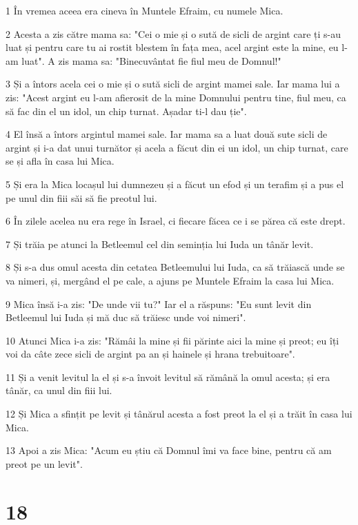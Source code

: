 \par 1 În vremea aceea era cineva în Muntele Efraim, cu numele Mica.
\par 2 Acesta a zis către mama sa: "Cei o mie și o sută de sicli de argint care ți s-au luat și pentru care tu ai rostit blestem în fața mea, acel argint este la mine, eu l-am luat". A zis mama sa: "Binecuvântat fie fiul meu de Domnul!"
\par 3 Și a întors acela cei o mie și o sută sicli de argint mamei sale. Iar mama lui a zis: "Acest argint eu l-am afierosit de la mine Domnului pentru tine, fiul meu, ca să fac din el un idol, un chip turnat. Așadar ti-l dau ție".
\par 4 El însă a întors argintul mamei sale. Iar mama sa a luat două sute sicli de argint și i-a dat unui turnător și acela a făcut din ei un idol, un chip turnat, care se și afla în casa lui Mica.
\par 5 Și era la Mica locașul lui dumnezeu și a făcut un efod și un terafim și a pus el pe unul din fiii săi să fie preotul lui.
\par 6 În zilele acelea nu era rege în Israel, ci fiecare făcea ce i se părea că este drept.
\par 7 Și trăia pe atunci la Betleemul cel din seminția lui Iuda un tânăr levit.
\par 8 Și s-a dus omul acesta din cetatea Betleemului lui Iuda, ca să trăiască unde se va nimeri, și, mergând el pe cale, a ajuns pe Muntele Efraim la casa lui Mica.
\par 9 Mica însă i-a zis: "De unde vii tu?" Iar el a răspuns: "Eu sunt levit din Betleemul lui Iuda și mă duc să trăiesc unde voi nimeri".
\par 10 Atunci Mica i-a zis: "Rămâi la mine și fii părinte aici la mine și preot; eu îți voi da câte zece sicli de argint pa an și hainele și hrana trebuitoare".
\par 11 Și a venit levitul la el și s-a învoit levitul să rămână la omul acesta; și era tânăr, ca unul din fiii lui.
\par 12 Și Mica a sfințit pe levit și tânărul acesta a fost preot la el și a trăit în casa lui Mica.
\par 13 Apoi a zis Mica: "Acum eu știu că Domnul îmi va face bine, pentru că am preot pe un levit".

\chapter{18}

